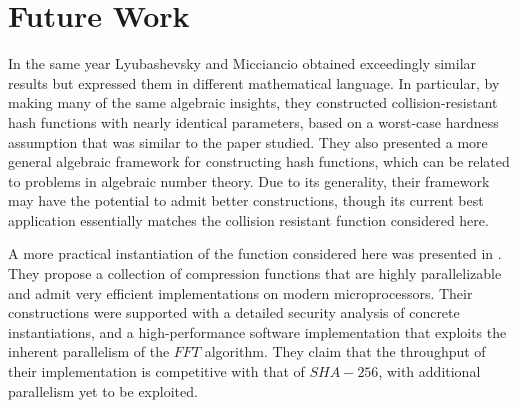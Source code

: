 \section{Future Work}
In the same year Lyubashevsky and Micciancio \cite{Lyubashevsky:2006:GCK:2097282.2097300} obtained exceedingly similar results but expressed them in different mathematical language. In particular, by making
many of the same algebraic insights, they constructed collision-resistant hash functions with nearly
identical parameters, based on a worst-case hardness assumption that was similar to the paper studied. They also presented a more general algebraic framework for constructing hash functions, which can be related to problems in algebraic number theory. Due to its generality, their framework may have the potential to admit better constructions, though its current best application essentially matches the collision resistant function considered here.
\par
A more practical instantiation of the function considered here was presented in \cite{Lyubashevsky:2008:SMP:1425852.1425858}. They propose a collection of compression functions that are highly parallelizable and admit very efficient implementations on modern microprocessors. Their constructions were supported with a detailed security analysis of concrete instantiations, and a high-performance software implementation that exploits the inherent parallelism of the $FFT$ algorithm. They claim that the throughput of their implementation is competitive with that of $SHA-256$, with additional parallelism yet to be exploited.